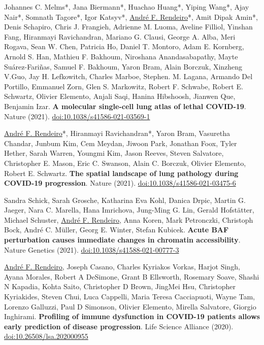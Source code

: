 \documentclass[11pt,a4paper,roman]{moderncv} %
\begin{document}
\begin{etaremune}[leftmargin=1.0cm, itemindent=0pt, topsep=10pt, itemsep=2pt, partopsep=0pt, parsep=0pt]
        \item Johannes C. Melms*, Jana Biermann*, Huachao Huang*, Yiping Wang*, Ajay Nair*, Somnath Tagore*, Igor Katsyv*, \underline{André F. Rendeiro}*, Amit Dipak Amin*, Denis Schapiro, Chris J. Frangieh, Adrienne M. Luoma, Aveline Filliol, Yinshan Fang, Hiranmayi Ravichandran, Mariano G. Clausi, George A. Alba, Meri Rogava, Sean W. Chen, Patricia Ho, Daniel T. Montoro, Adam E. Kornberg, Arnold S. Han, Mathieu F. Bakhoum, Niroshana Anandasabapathy, Mayte Suárez-Fariñas, Samuel F. Bakhoum, Yaron Bram, Alain Borczuk, Xinzheng V.Guo, Jay H. Lefkowitch, Charles Marboe, Stephen. M. Lagana, Armando Del Portillo, Emmanuel Zorn, Glen S. Markowitz, Robert F. Schwabe, Robert E. Schwartz, Olivier Elemento, Anjali Saqi, Hanina Hibshoosh, Jianwen Que, Benjamin Izar. \textbf{A molecular single-cell lung atlas of lethal COVID-19}. Nature (2021).
        \href{https://dx.doi.org/10.1038/s41586-021-03569-1}{doi:10.1038/s41586-021-03569-1}

        \item \underline{André F. Rendeiro}*, Hiranmayi Ravichandran*, Yaron Bram, Vasuretha Chandar, Junbum Kim, Cem Meydan, Jiwoon Park, Jonathan Foox, Tyler Hether, Sarah Warren, Youngmi Kim, Jason Reeves, Steven Salvatore, Christopher E. Mason, Eric C. Swanson, Alain C. Borczuk, Olivier Elemento, Robert E. Schwartz. \textbf{The spatial landscape of lung pathology during COVID-19 progression}. Nature (2021).
        \href{https://dx.doi.org/10.1038/s41586-021-03475-6}{doi:10.1038/s41586-021-03475-6}

        \item Sandra Schick, Sarah Grosche, Katharina Eva Kohl, Danica Drpic, Martin G. Jaeger, Nara C. Marella, Hana Imrichova, Jung-Ming G. Lin, Gerald Hofstätter, Michael Schuster, \underline{André F. Rendeiro}, Anna Koren, Mark Petronczki, Christoph Bock, André C. Müller, Georg E. Winter, Stefan Kubicek. \textbf{Acute BAF perturbation causes immediate changes in chromatin accessibility}. Nature Genetics (2021).
        \href{https://dx.doi.org/10.1038/s41588-021-00777-3}{doi:10.1038/s41588-021-00777-3}

        \item \underline{André F. Rendeiro}, Joseph Casano, Charles Kyriakos Vorkas, Harjot Singh, Ayana Morales, Robert A DeSimone, Grant B Ellsworth, Rosemary Soave, Shashi N Kapadia, Kohta Saito, Christopher D Brown, JingMei Hsu, Christopher Kyriakides, Steven Chui, Luca Cappelli, Maria Teresa Cacciapuoti, Wayne Tam, Lorenzo Galluzzi, Paul D Simonson, Olivier Elemento, Mirella Salvatore, Giorgio Inghirami. \textbf{Profiling of immune dysfunction in COVID-19 patients allows early prediction of disease progression}. Life Science Alliance (2020).
        \href{https://dx.doi.org/10.26508/lsa.202000955}{doi:10.26508/lsa.202000955}


\end{etaremune}
\end{document}

